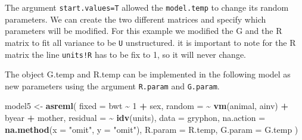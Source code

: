 \documentclass[
  12pt,
]{book}
\newenvironment{Shaded}{\begin{snugshade}}{\end{snugshade}}
\newcommand{\DataTypeTok}[1]{\textcolor[rgb]{0.13,0.29,0.53}{#1}}
\newcommand{\DecValTok}[1]{\textcolor[rgb]{0.00,0.00,0.81}{#1}}
\newcommand{\KeywordTok}[1]{\textcolor[rgb]{0.13,0.29,0.53}{\textbf{#1}}}
\newcommand{\NormalTok}[1]{#1}
\newcommand{\OperatorTok}[1]{\textcolor[rgb]{0.81,0.36,0.00}{\textbf{#1}}}
\newcommand{\StringTok}[1]{\textcolor[rgb]{0.31,0.60,0.02}{#1}}
\begin{document}
\begin{Shaded}
\end{Shaded}

The argument \texttt{start.values=T} allowed the \texttt{model.temp} to change its random parameters. We can create the two different matrices and specify which parameters will be modified. For this example we modified the G and the R matrix to fit all variance to be \texttt{U} unstructured. it is important to note for the R matrix the line \texttt{units!R} has to be fix to 1, so it will never change.

The object G.temp and R.temp can be implemented in the following model as new parameters using the argument \texttt{R.param} and \texttt{G.param}.

\begin{Shaded}
\begin{Highlighting}[]
\NormalTok{model5 \textless{}{-}}\StringTok{ }\KeywordTok{asreml}\NormalTok{(}
  \DataTypeTok{fixed =}\NormalTok{ bwt }\OperatorTok{\textasciitilde{}}\StringTok{ }\DecValTok{1} \OperatorTok{+}\StringTok{ }\NormalTok{sex,}
  \DataTypeTok{random =} \OperatorTok{\textasciitilde{}}\StringTok{ }\KeywordTok{vm}\NormalTok{(animal, ainv) }\OperatorTok{+}\StringTok{ }\NormalTok{byear }\OperatorTok{+}\StringTok{ }\NormalTok{mother,}
  \DataTypeTok{residual =} \OperatorTok{\textasciitilde{}}\StringTok{ }\KeywordTok{idv}\NormalTok{(units),}
  \DataTypeTok{data =}\NormalTok{ gryphon,}
  \DataTypeTok{na.action =} \KeywordTok{na.method}\NormalTok{(}\DataTypeTok{x =} \StringTok{"omit"}\NormalTok{, }\DataTypeTok{y =} \StringTok{"omit"}\NormalTok{),}
  \DataTypeTok{R.param =}\NormalTok{ R.temp, }\DataTypeTok{G.param =}\NormalTok{ G.temp}
\NormalTok{)}
\end{Highlighting}
\end{Shaded}
\end{document}
